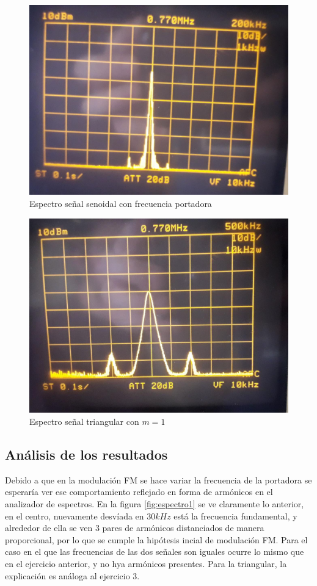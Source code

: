 \begin{figure}[H]
    \centering
    \includegraphics[scale=0.3]{Recursos/Ej4_senoidal_800K.jpeg}
    \caption{Espectro señal senoidal con frecuencia portadora}
\end{figure}

\begin{figure}[H]
    \centering
    \includegraphics[scale=0.3]{Recursos/Ej4_triangular_m1.jpeg}
    \caption{Espectro señal triangular con $m = 1$}
\end{figure}


\subsection{An\'alisis de los resultados}

Debido a que en la modulación FM se hace variar la frecuencia de la portadora se esperaría ver ese comportamiento reflejado en forma de armónicos en el analizador de espectros. En la figura \ref{fig:espectro1} se ve claramente lo anterior, en el centro, nuevamente desvíada en $30kHz$ está la frecuencia fundamental, y alrededor de ella se ven 3 pares de armónicos distanciados de manera proporcional, por lo que se cumple la hipótesis incial de modulación FM. Para el caso en el que las frecuencias de las dos señales son iguales ocurre lo mismo que en el ejercicio anterior, y no hya armónicos presentes. Para la triangular, la explicación es análoga al ejercicio 3.

